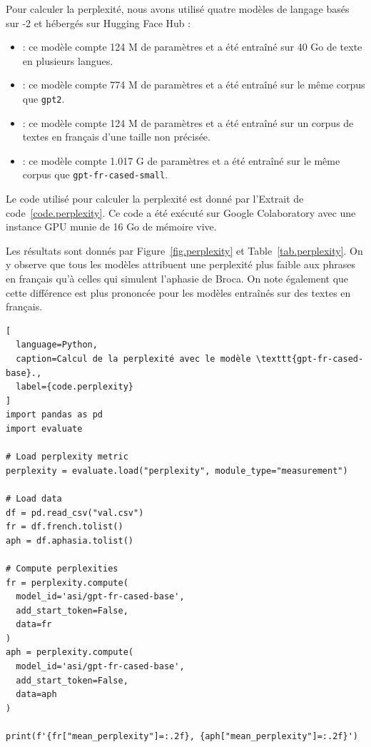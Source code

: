 Pour calculer la perplexité, nous avons utilisé quatre modèles de langage basés sur -2
et hébergés sur \foreignlanguage{english}{Hugging Face Hub} :
\begin{itemize}
  \item {} : 
  ce modèle compte 124 M de paramètres et a été entraîné sur 40 Go de texte en plusieurs langues.
  \item {} :
  ce modèle compte 774 M de paramètres et a été entraîné sur le même corpus que \verb|gpt2|.
  \item {} :
  ce modèle compte 124 M de paramètres et a été entraîné sur un corpus de textes en français d'une taille non précisée.
  \item {} :
  ce modèle compte 1.017 G de paramètres et a été entraîné sur le même corpus que \verb|gpt-fr-cased-small|.
\end{itemize}
Le code utilisé pour calculer la perplexité est donné par l'Extrait de code~\ref{code.perplexity}.
Ce code a été exécuté sur Google Colaboratory avec une instance GPU munie de 16 Go de mémoire vive.

Les résultats sont donnés par Figure~\ref{fig.perplexity} et Table~\ref{tab.perplexity}.
On y observe que tous les modèles attribuent une perplexité plus faible 
aux phrases en français qu'à celles qui simulent l'aphasie de Broca.
On note également que cette différence est plus prononcée pour les modèles entraînés sur des textes en français.

\begin{lstlisting}[
  language=Python,
  caption=Calcul de la perplexité avec le modèle \texttt{gpt-fr-cased-base}.,
  label={code.perplexity}
]
import pandas as pd
import evaluate

# Load perplexity metric
perplexity = evaluate.load("perplexity", module_type="measurement")

# Load data
df = pd.read_csv("val.csv")
fr = df.french.tolist()
aph = df.aphasia.tolist()

# Compute perplexities
fr = perplexity.compute(
  model_id='asi/gpt-fr-cased-base', 
  add_start_token=False, 
  data=fr
)
aph = perplexity.compute(
  model_id='asi/gpt-fr-cased-base', 
  add_start_token=False, 
  data=aph
)

print(f'{fr["mean_perplexity"]=:.2f}, {aph["mean_perplexity"]=:.2f}')
\end{lstlisting}

